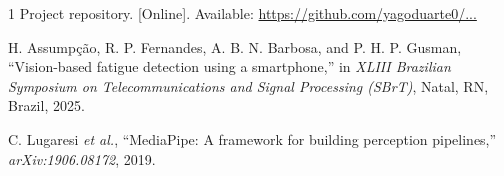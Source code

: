 \documentclass[conference]{IEEEtran}
\begin{document}
\begin{thebibliography}{1}
Project repository. [Online]. Available: \url{https://github.com/yagoduarte0/...}

 H. Assump\c{c}\~ao, R. P. Fernandes, A. B. N. Barbosa, and
P. H. P. Gusman, ``Vision-based fatigue detection using a smartphone,'' in
\emph{XLIII Brazilian Symposium on Telecommunications and Signal Processing
(SBrT)}, Natal, RN, Brazil, 2025.

 C. Lugaresi \emph{et al.}, ``MediaPipe: A framework for
building perception pipelines,'' \emph{arXiv:1906.08172}, 2019.
\end{thebibliography}
\end{document}
